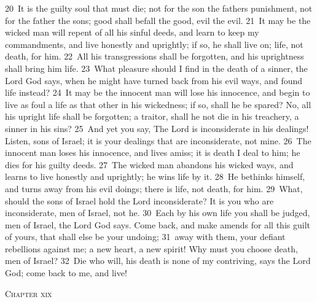 \documentclass[10pt]{book} %
\begin{document}
\textcolor{benred8}{20}~It is the guilty soul that must die; not for the son the father\textquotesingle s punishment, not for the father the son\textquotesingle s; good shall befall the good, evil the evil. \textcolor{benred8}{21}~It may be the wicked man will repent of all his sinful deeds, and learn to keep my commandments, and live honestly and uprightly; if so, he shall live on; life, not death, for him. \textcolor{benred8}{22}~All his transgressions shall be forgotten, and his uprightness shall bring him life. \textcolor{benred8}{23}~What pleasure should I find in the death of a sinner, the Lord God says, when he might have turned back from his evil ways, and found life instead? \textcolor{benred8}{24}~It may be the innocent man will lose his innocence, and begin to live as foul a life as that other in his wickedness; if so, shall he be spared? No, all his upright life shall be forgotten; a traitor, shall he not die in his treachery, a sinner in his sins? \textcolor{benred8}{25}~And yet you say, The Lord is inconsiderate in his dealings! Listen, sons of Israel; it is your dealings that are inconsiderate, not mine. \textcolor{benred8}{26}~The innocent man loses his innocence, and lives amiss; it is death I deal to him; he dies for his guilty deeds. \textcolor{benred8}{27}~The wicked man abandons his wicked ways, and learns to live honestly and uprightly; he wins life by it. \textcolor{benred8}{28}~He bethinks himself, and turns away from his evil doings; there is life, not death, for him.
\textcolor{benred8}{29}~What, should the sons of Israel hold the Lord inconsiderate? It is you who are inconsiderate, men of Israel, not he. \textcolor{benred8}{30}~Each by his own life you shall be judged, men of Israel, the Lord God says. Come back, and make amends for all this guilt of yours, that shall else be your undoing; \textcolor{benred8}{31}~away with them, your defiant rebellions against me; a new heart, a new spirit! Why must you choose death, men of Israel? \textcolor{benred8}{32}~Die who will, his death is none of my contriving, says the Lord God; come back to me, and live!
\begin{large}\begin{center}\textsc{Chapter xix}\end{center}\end{large}
\end{document}
